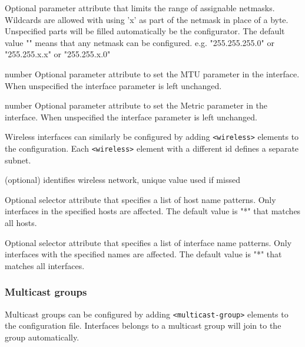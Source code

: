 \begin{compactitem}
    \item {}
      Optional parameter attribute that limits the range of assignable
      netmasks. Wildcards are allowed with using 'x' as part of the netmask
      in place of a byte. Unspecified parts will be filled automatically be
      the configurator. The default value "" means that any netmask can be
      configured.
      e.g. "255.255.255.0" or "255.255.x.x" or "255.255.x.0"

    \item {}                number
      Optional parameter attribute to set the MTU parameter in the interface.
      When unspecified the interface parameter is left unchanged.

    \item {}                number
      Optional parameter attribute to set the Metric parameter in the interface.
      When unspecified the interface parameter is left unchanged.
\end{compactitem}

Wireless interfaces can similarly be configured by adding
\verb!<wireless>! elements to the configuration. Each \verb!<wireless>!
element with a different id defines a separate subnet.
\begin{compactitem}
    \item {} (optional)
      identifies wireless network, unique value used if missed

    \item {}
      Optional selector attribute that specifies a list of host name patterns.
      Only interfaces in the specified hosts are affected. The default value
      is "*" that matches all hosts.

    \item {}
      Optional selector attribute that specifies a list of interface name
      patterns. Only interfaces with the specified names are affected. The
      default value is "*" that matches all interfaces.
\end{compactitem}


\subsubsection{Multicast groups}

Multicast groups can be configured by adding \verb!<multicast-group>!
elements to the configuration file. Interfaces belongs to a multicast
group will join to the group automatically.

